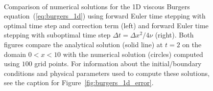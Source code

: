 \documentclass[fleqn,12pt,twoside]{article}
\def\dt{\Delta t}
\def\dx{\Delta x}
\begin{document}
\begin{figure}[tb]
\begin{center}
\ \ \ \ \ 
\caption{Comparison of numerical solutions for the 1D viscous Burgers 
equation~(\ref{eq:burgers_1d}) using forward Euler time stepping with 
optimal time step and correction term (left) and forward Euler time 
stepping with suboptimal time step $\dt = \dx^2/4 \nu$ (right).  
Both figures compare the analytical solution (solid line) at $t = 2$ on the 
domain $0 < x < 10$ with the numerical solution (circles) computed using 
$100$ grid points.  
For information about the initial/boundary conditions and physical parameters 
used to compute these solutions, see the caption for 
Figure~\ref{fig:burgers_1d_error}. 
}
\label{fig:burgers_1d_solns}
\end{center}
\end{figure}
\end{document}

